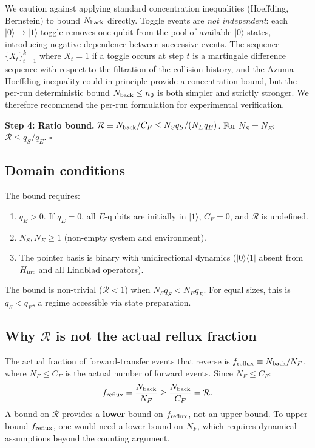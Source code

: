\documentclass[aps,pra,onecolumn]{revtex4-2}
\begin{document}
We caution against applying standard concentration inequalities (Hoeffding, Bernstein) to bound $N_{\rm back}$ directly. Toggle events are \textit{not independent}: each $|0\rangle \to |1\rangle$ toggle removes one qubit from the pool of available $|0\rangle$ states, introducing negative dependence between successive events. The sequence $\{X_t\}_{t=1}^k$ where $X_t = 1$ if a toggle occurs at step $t$ is a martingale difference sequence with respect to the filtration of the collision history, and the Azuma-Hoeffding inequality could in principle provide a concentration bound, but the per-run deterministic bound $N_{\rm back} \leq n_0$ is both simpler and strictly stronger. We therefore recommend the per-run formulation for experimental verification.

\textbf{Step 4: Ratio bound.} $\mathcal{R} \equiv N_{\rm back}/C_F \leq N_S q_S/(N_E q_E)$. For $N_S = N_E$: $\mathcal{R} \leq q_S/q_E$. $\square$

\subsection{Domain conditions}

The bound requires:
\begin{enumerate}
\item $q_E > 0$. If $q_E = 0$, all $E$-qubits are initially in $|1\rangle$, $C_F = 0$, and $\mathcal{R}$ is undefined.
\item $N_S, N_E \geq 1$ (non-empty system and environment).
\item The pointer basis is binary with unidirectional dynamics ($|0\rangle\langle 1|$ absent from $H_{\rm int}$ and all Lindblad operators).
\end{enumerate}

The bound is non-trivial ($\mathcal{R} < 1$) when $N_S q_S < N_E q_E$. For equal sizes, this is $q_S < q_E$, a regime accessible via state preparation.

\subsection{Why $\mathcal{R}$ is not the actual reflux fraction}

The actual fraction of forward-transfer events that reverse is $f_{\rm reflux} \equiv N_{\rm back}/N_F$, where $N_F \leq C_F$ is the actual number of forward events. Since $N_F \leq C_F$:
\begin{equation}
f_{\rm reflux} = \frac{N_{\rm back}}{N_F} \geq \frac{N_{\rm back}}{C_F} = \mathcal{R}.
\end{equation}
A bound on $\mathcal{R}$ provides a \textbf{lower} bound on $f_{\rm reflux}$, not an upper bound. To upper-bound $f_{\rm reflux}$, one would need a lower bound on $N_F$, which requires dynamical assumptions beyond the counting argument.
\end{document}

